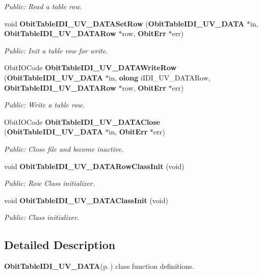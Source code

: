 \begin{CompactItemize}
\begin{CompactList}\small\item\em Public: Read a table row. \item\end{CompactList}\item 
void {\bf Obit\-Table\-IDI\_\-UV\_\-DATASet\-Row} ({\bf Obit\-Table\-IDI\_\-UV\_\-DATA} $\ast$in, {\bf Obit\-Table\-IDI\_\-UV\_\-DATARow} $\ast$row, {\bf Obit\-Err} $\ast$err)
\begin{CompactList}\small\item\em Public: Init a table row for write. \item\end{CompactList}\item 
Obit\-IOCode {\bf Obit\-Table\-IDI\_\-UV\_\-DATAWrite\-Row} ({\bf Obit\-Table\-IDI\_\-UV\_\-DATA} $\ast$in, {\bf olong} i\-IDI\_\-UV\_\-DATARow, {\bf Obit\-Table\-IDI\_\-UV\_\-DATARow} $\ast$row, {\bf Obit\-Err} $\ast$err)
\begin{CompactList}\small\item\em Public: Write a table row. \item\end{CompactList}\item 
Obit\-IOCode {\bf Obit\-Table\-IDI\_\-UV\_\-DATAClose} ({\bf Obit\-Table\-IDI\_\-UV\_\-DATA} $\ast$in, {\bf Obit\-Err} $\ast$err)
\begin{CompactList}\small\item\em Public: Close file and become inactive. \item\end{CompactList}\item 
void {\bf Obit\-Table\-IDI\_\-UV\_\-DATARow\-Class\-Init} (void)
\begin{CompactList}\small\item\em Public: Row Class initializer. \item\end{CompactList}\item 
void {\bf Obit\-Table\-IDI\_\-UV\_\-DATAClass\-Init} (void)
\begin{CompactList}\small\item\em Public: Class initializer. \item\end{CompactList}\end{CompactItemize}


\subsection{Detailed Description}
{\bf Obit\-Table\-IDI\_\-UV\_\-DATA}{\rm (p.\,\pageref{structObitTableIDI__UV__DATA})} class function definitions. 

